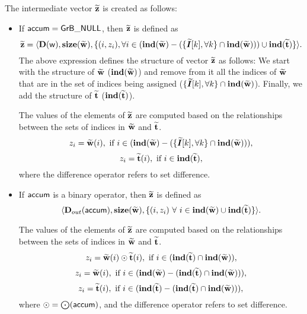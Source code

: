 The intermediate vector ${\bf \widetilde{z}}$ is created as follows:
\begin{itemize}
    \item If ${\sf accum} = {\sf GrB\_NULL}$, then ${\bf \widetilde{z}}$ is defined as 
    \[ 
        {\bf \widetilde{z}} =
		\langle \bold{D}({\sf w}), \bold{size}({\bf \widetilde{w}}), 
		\{(i,z_{i}), \forall i \in (\bold{ind}({\bf \widetilde{w}}) - (\{
            \bm{\widetilde{I}}[k],
            \forall k\} \cap \bold{ind}({\bf \widetilde{w}}))) \cup
        \bold{ind}({\bf \widetilde{t}}) \} \rangle.
    \]
    The above expression defines the structure of vector ${\bf \widetilde{z}}$ as follows:
    We start with the structure of ${\bf \widetilde{w}}$ ($\bold{ind}({\bf \widetilde{w}})$) and remove from 
    it all the indices of ${\bf \widetilde{w}}$ that are
    in the set of indices being assigned ($\{\bm{\widetilde{I}}[k],\forall k\} \cap \bold{ind}({\bf \widetilde{w}})$). Finally, we
    add the structure of ${\bf \widetilde{t}}$ ($\bold{ind}({\bf \widetilde{t}})$).

    The values of the elements of ${\bf \widetilde{z}}$ are computed based on the 
    relationships between the sets of indices in ${\bf \widetilde{w}}$ 
    and ${\bf \widetilde{t}}$.
    \[
        z_{i} = \vector{\widetilde{w}}(i), \ \mbox{if}\  i \in  
        (\bold{ind}(\vector{\widetilde{w}}) - (\{\grbarray{\widetilde{I}}[k],\forall k\}
        \cap \bold{ind}(\vector{\widetilde{w}}))),
    \]
    \[
        z_{i} = \vector{\widetilde{t}}(i), \ \mbox{if}\  i \in  
        \bold{ind}(\vector{\widetilde{t}}),
    \]
    where the difference operator refers to set difference.

    \item If ${\sf accum}$ is a binary operator, then ${\bf \widetilde{z}}$ is defined as
        \[ \langle \mbox{$\mathbf{D}_{out}$}({\sf accum}), \bold{size}({\bf \widetilde{w}}),
        \{(i,z_{i}) \ \forall \ i \in \bold{ind}({\bf \widetilde{w}}) \cup 
        \bold{ind}({\bf \widetilde{t}}) \} \rangle.\]

    The values of the elements of ${\bf \widetilde{z}}$ are computed based on the 
    relationships between the sets of indices in ${\bf \widetilde{w}}$ and 
    ${\bf \widetilde{t}}$.
\[
    z_{i} = {\bf \widetilde{w}}(i) \odot {\bf \widetilde{t}}(i), \ \mbox{if}\  
    i \in  (\bold{ind}({\bf \widetilde{t}}) \cap \bold{ind}({\bf \widetilde{w}})),
\]
\[
    z_{i} = {\bf \widetilde{w}}(i), \ \mbox{if}\  
    i \in (\bold{ind}({\bf \widetilde{w}}) - (\bold{ind}({\bf \widetilde{t}})
    \cap \bold{ind}({\bf \widetilde{w}}))),
\]
\[
    z_{i} = \vector{\widetilde{t}}(i), \ \mbox{if}\  i \in  
    (\bold{ind}(\vector{\widetilde{t}}) - (\bold{ind}(\vector{\widetilde{t}})
    \cap \bold{ind}(\vector{\widetilde{w}}))),
\]
where $\odot  = \bigodot({\sf accum})$, and the difference operator refers to set difference.
\end{itemize}

